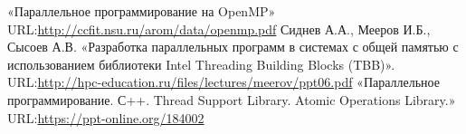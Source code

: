 \documentclass{report}
\begin{document}
\begin{thebibliography}{1}
\bibitem{} «Параллельное программирование на OpenMP»
\\URL:\url {http://ccfit.nsu.ru/arom/data/openmp.pdf} 
 Сиднев А.А., Мееров И.Б., Сысоев А.В. «Разработка параллельных программ в системах с общей памятью с использованием библиотеки Intel Threading Building Blocks (TBB)».
\\URL:\url {http://hpc-education.ru/files/lectures/meerov/ppt06.pdf} 
\bibitem{} «Параллельное программирование. С++. Thread Support Library. Atomic Operations Library.»
\\URL:\url {https://ppt-online.org/184002} 
\end{thebibliography}
\newpage

\end{document}
